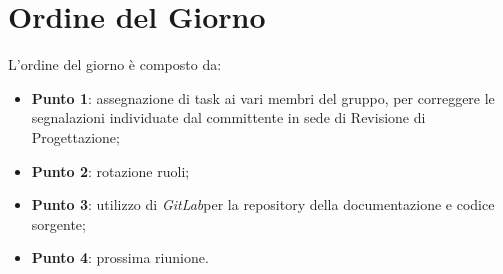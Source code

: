 \section{Ordine del Giorno}
L'ordine del giorno è composto da: 
\begin{itemize}
	\item \textbf{Punto 1}: assegnazione di task ai vari membri del gruppo, per correggere le
	segnalazioni individuate dal committente in sede di Revisione di Progettazione;
	\item \textbf{Punto 2}: rotazione ruoli; 
	\item \textbf{Punto 3}: utilizzo di \textit{GitLab}\glossario per la repository della documentazione e codice sorgente;   
	\item \textbf{Punto 4}: prossima riunione.
\end{itemize}